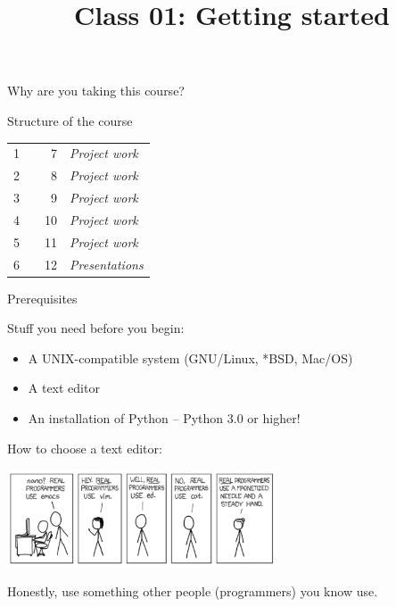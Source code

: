 \documentclass[10pt, compress]{beamer}
\title{Class 01: Getting started }
\begin{document}
\maketitle

\begin{frame}{Why are you taking this course?}

\end{frame}

\begin{frame}{Structure of the course}

\begin{center}
\begin{tabular}{rlrl}
1  &  & 7   & \emph{Project work}  \\
2  &  & 8   &  \emph{Project work} \\
3  &  & 9   &  \emph{Project work} \\
4  &  & 10   &  \emph{Project work} \\
5  &  & 11   & \emph{Project work}  \\
6  &  & 12   & \emph{Presentations}  \\
\end{tabular}
\end{center}

\end{frame}

\begin{frame}{Prerequisites}

Stuff you need before you begin:
\begin{itemize}
 \item A UNIX-compatible system (GNU/Linux, *BSD, Mac/OS)
 \item A text editor
 \item An installation of Python -- Python 3.0 or higher!
\end{itemize}

How to choose a text editor:

\begin{center}
  \includegraphics[width=0.6\textwidth]{graphics/realprogrammers.png}
\end{center}

Honestly, use something other people (programmers) you know use.

\end{frame}
\end{document}
